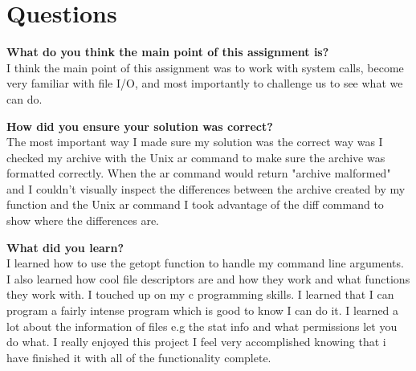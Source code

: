 \documentclass[letterpaper,10pt,notitlepage,fleqn]{article}
\begin{document}
\section*{Questions}

\textbf{What do you think the main point of this assignment is?}\\
I think the main point of this assignment was to work with system calls, become very familiar with file I/O, and most importantly to challenge us to see what we can do.  
    
\textbf{How did you ensure your solution was correct?}\\
The most important way I made sure my solution was the correct way was I checked my archive with the Unix ar command to make sure the archive was formatted correctly. When the ar command would return "archive malformed" and I couldn't visually inspect the differences between the archive created by my function and the Unix ar command I took advantage of the diff command to show where the differences are. 
    
\textbf{What did you learn?}\\
I learned how to use the getopt function to handle my command line arguments. I also learned how cool file descriptors are and how they work and what functions they work with. I touched up on my c programming skills. I learned that I can program a fairly intense program which is good to know I can do it. I learned a lot about the information of files e.g the stat info and what permissions let you do what. I really enjoyed this project I feel very accomplished knowing that i have finished it with all of the functionality complete.
    
\end{document}
